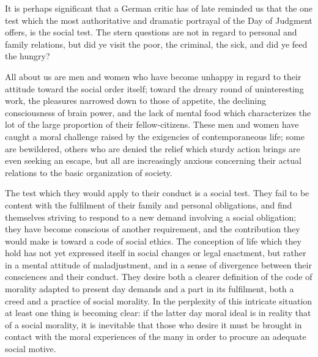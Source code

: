It is perhaps significant that a German critic has of late reminded us
that the one test which the most authoritative and dramatic portrayal
of the Day of Judgment offers, is the social test. The stern questions
are not in regard to personal and family relations, but did ye visit
the poor, the criminal, the sick, and did ye feed the hungry?

All about us are men and women who have become unhappy in regard to
their attitude toward the social order itself; toward the dreary round
of uninteresting work, the pleasures narrowed down to those of
appetite, the declining consciousness of brain power, and the lack of
mental food which characterizes the lot of the large proportion of
their fellow-citizens. These men and women have caught a moral
challenge raised by the exigencies of contemporaneous life; some are
bewildered, others who are denied  the relief which sturdy
action brings are even seeking an escape, but all are increasingly
anxious concerning their actual relations to the basic organization of
society.

The test which they would apply to their conduct is a social test.
They fail to be content with the fulfilment of their family and
personal obligations, and find themselves striving to respond to a new
demand involving a social obligation; they have become conscious of
another requirement, and the contribution they would make is toward a
code of social ethics. The conception of life which they hold has not
yet expressed itself in social changes or legal enactment, but rather
in a mental attitude of maladjustment, and in a sense of divergence
between their consciences and their conduct. They desire both a
clearer definition of the code of morality adapted to present day
demands and a part in its fulfilment, both a creed and a practice of
social morality. In the perplexity of this intricate situation at
least one thing is becoming clear: if the latter  day moral
ideal is in reality that of a social morality, it is inevitable that
those who desire it must be brought in contact with the moral
experiences of the many in order to procure an adequate social motive.

